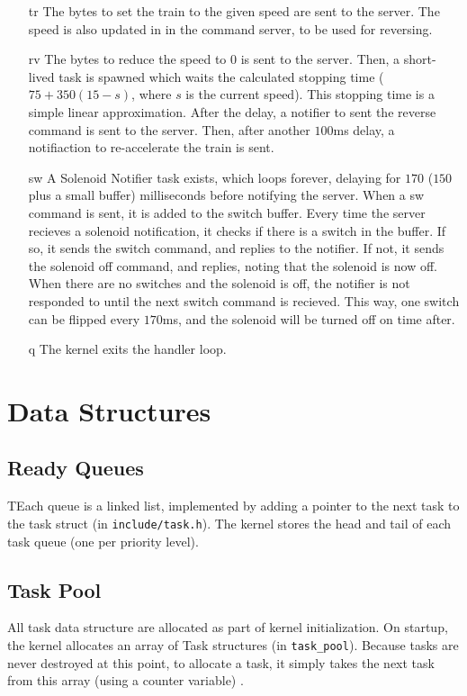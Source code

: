 \documentclass{article}
\begin{document}
\begin{enumerate}
\item[tr] The bytes to set the train to the given speed are sent to the server. The speed is also updated in in the command server, to be used for reversing.
\item[rv] The bytes to reduce the speed to 0 is sent to the server. Then, a short-lived task is spawned which waits the calculated stopping time ($75 + 350(15 - s)$, where $s$ is the current speed).
This stopping time is a simple linear approximation.
After the delay, a notifier to sent the reverse command is sent to the server. Then, after another $100$ms delay, a notifiaction to re-accelerate the train is sent.
\item[sw] A Solenoid Notifier task exists, which loops forever, delaying for $170$ ($150$ plus a small buffer) milliseconds before notifying the server. 
When a sw command is sent, it is added to the switch buffer. 
Every time the server recieves a solenoid notification, it checks if there is a switch in the buffer. 
If so, it sends the switch command, and replies to the notifier. 
If not, it sends the solenoid off command, and replies, noting that the solenoid is now off. 
When there are no switches and the solenoid is off, the notifier is not responded to until the next switch command is recieved.
This way, one switch can be flipped every $170$ms, and the solenoid will be turned off on time after.
\item[q] The kernel exits the handler loop. 
\end{enumerate}
\section{Data Structures}
\subsection{Ready Queues}
TEach queue is a linked list, implemented by adding a pointer to the next task to the task struct (in \verb|include/task.h|). 
The kernel stores the head and tail of each task queue (one per priority level).
\subsection{Task Pool}
All task data structure are allocated as part of kernel initialization. On startup, the kernel allocates an array of Task structures (in \verb|task_pool|). Because tasks are never destroyed at this point, to allocate a task, it simply takes the next task from this array (using a counter variable) . 
\end{document}
